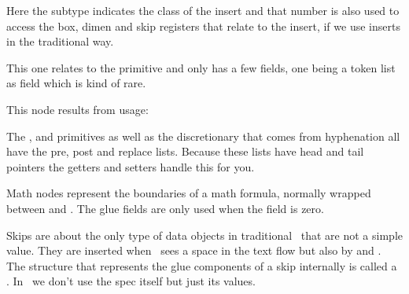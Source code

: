 Here the subtype indicates the class of the insert and that number is also used
to access the box, dimen and skip registers that relate to the insert, if we
use inserts in the traditional way.


\stopsubsection

\startsubsection[title={mark}]

This one relates to the \type {\marks} primitive and only has a few fields, one
being a token list as field which is kind of rare.



\stopsubsection

\startsubsection[title={adjust}]

This node results from \type {\vadjust} usage:



\stopsubsection

\startsubsection[title={disc (discretionary)}]

The \typ {\discretionary}, \typ {\explicitdiscretionary} and \typ
{\automaticdiscretionary} primitives as well as the discretionary that comes from
hyphenation all have the pre, post and replace lists. Because these lists have
head and tail pointers the getters and setters handle this for you.



\stopsubsection

\startsubsection[title={math}]

Math nodes represent the boundaries of a math formula, normally wrapped between
\type {$} and \type {$}. The glue fields are only used when the 
field is zero.



\stopsubsection

\startsubsection[title={glue}]

Skips are about the only type of data objects in traditional \TEX\ that are not a
simple value. They are inserted when \TEX\ sees a space in the text flow but also
by \type {\hskip} and . The structure that represents the glue
components of a skip internally is called a . In \LUAMETATEX\ we
don't use the spec itself but just its values.

